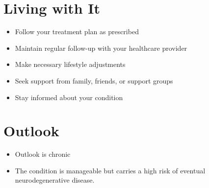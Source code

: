 \section{Living with It}
\begin{itemize}[noitemsep]
  \item Follow your treatment plan as prescribed
  \item Maintain regular follow-up with your healthcare provider
  \item Make necessary lifestyle adjustments
  \item Seek support from family, friends, or support groups
  \item Stay informed about your condition
\end{itemize}
\section{Outlook}
\begin{itemize}[noitemsep]
  \item Outlook is chronic
  \item The condition is manageable but carries a high risk of eventual neurodegenerative disease.
\end{itemize}
